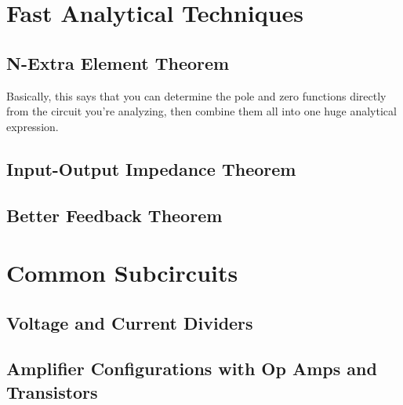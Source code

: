 \section{Fast Analytical Techniques}
\subsection{N-Extra Element Theorem}
Basically, this says that you can determine the pole and zero functions directly from the circuit you're analyzing, then combine them all into one huge analytical expression.
\subsection{Input-Output Impedance Theorem}
\subsection{Better Feedback Theorem}
\section{Common Subcircuits}
\subsection{Voltage and Current Dividers}





\subsection{Amplifier Configurations with Op Amps and Transistors}
